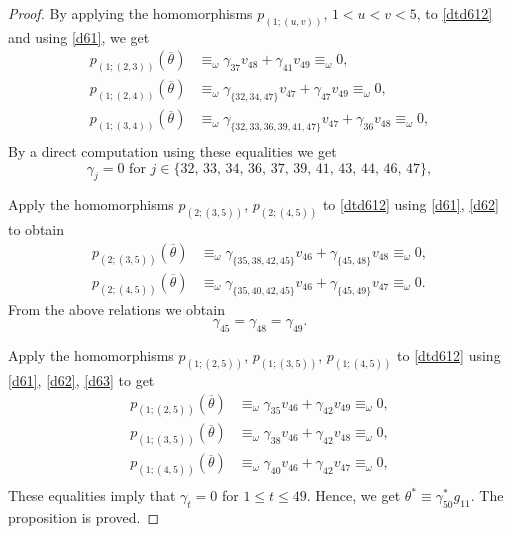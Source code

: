 \documentclass[reqno]{amsart}
\theoremstyle{plain}
\theoremstyle{definition}
\theoremstyle{plain}
\theoremstyle{definition}
\numberwithin{equation}{section}
\begin{document}
\begin{proof}
By applying the homomorphisms $p_{(1;(u,v))},\, 1 < u < v < 5$, to \eqref{dtd612} and using \eqref{d61}, we get
\begin{align*}
p_{(1;(2,3))}(\overline{\theta}) &\equiv_\omega \gamma_{37}v_{48} + \gamma_{41}v_{49} \equiv_\omega 0,\\
p_{(1;(2,4))}(\overline{\theta}) &\equiv_\omega \gamma_{\{32,34,47\}}v_{47} + \gamma_{47}v_{49}  \equiv_\omega 0,\\
p_{(1;(3,4))}(\overline{\theta}) &\equiv_\omega \gamma_{\{32,33,36,39,41,47\}}v_{47} + \gamma_{36}v_{48} \equiv_\omega 0,\\
\end{align*}
By a direct computation using these equalities we get
\begin{equation}\label{d62}
\gamma_j = 0 \mbox{ for } j \in \{32,\, 33,\, 34,\, 36,\, 37,\, 39,\, 41,\, 43,\, 44,\, 46,\, 47\},
\end{equation}

Apply the homomorphisms $p_{(2;(3,5))}$, $p_{(2;(4,5))}$ to \eqref{dtd612} using \eqref{d61}, \eqref{d62} to obtain
\begin{align*}
p_{(2;(3,5))}(\overline{\theta}) &\equiv_\omega \gamma_{\{35,38,42,45\}}v_{46} + \gamma_{\{45,48\}}v_{48} \equiv_\omega 0,\\
p_{(2;(4,5))}(\overline{\theta}) &\equiv_\omega \gamma_{\{35,40,42,45\}}v_{46} + \gamma_{\{45,49\}}v_{47} \equiv_\omega 0.
\end{align*}
From the above relations we obtain
\begin{equation}\label{d63}
 \gamma_{45} = \gamma_{48} =\gamma_{49}.
\end{equation}

Apply the homomorphisms $p_{(1;(2,5))}$, $p_{(1;(3,5))}$, $p_{(1;(4,5))}$ to \eqref{dtd612} using \eqref{d61}, \eqref{d62}, \eqref{d63} to get
\begin{align*}
p_{(1;(2,5))}(\overline{\theta}) &\equiv_\omega \gamma_{35}v_{46} + \gamma_{42}v_{49} \equiv_\omega 0,\\
p_{(1;(3,5))}(\overline{\theta}) &\equiv_\omega \gamma_{38}v_{46} + \gamma_{42}v_{48} \equiv_\omega 0,\\
p_{(1;(4,5))}(\overline{\theta}) &\equiv_\omega \gamma_{40}v_{46} + \gamma_{42}v_{47} \equiv_\omega 0,\\
\end{align*}
These equalities imply that $\gamma_t = 0$ for $1 \leqslant t \leqslant 49$. Hence, we get $\theta^* \equiv \gamma_{50}^*g_{11}$. The proposition is proved.
\end{proof}
\end{document}
